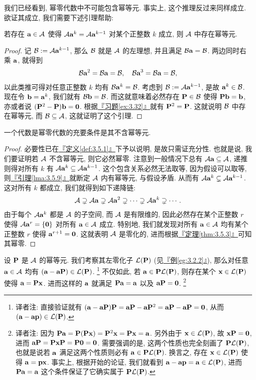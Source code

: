 \documentclass[lang=cn,zihao=-4,twoside,fontset=none]{textbook}
\def\eq#1{\[\begin{aligned}{}#1\end{aligned}\]}
\newcommand{\thmref}[1]{\hyperref[#1]{『定理\textnormal{\ref*{#1}}』}}
\newcommand{\defref}[1]{\hyperref[#1]{『定义\textnormal{\ref*{#1}}』}}
\newcommand{\lmaref}[1]{\hyperref[#1]{『引理\textnormal{\ref*{#1}}』}}
\newcommand{\egref}[1]{\hyperref[#1]{『例\textnormal{\ref*{#1}}』}}
\newcommand{\exref}[1]{\hyperref[#1]{『习题\textnormal{\ref*{#1}}』}}
\newcommand{\set}[1]{\{#1\}}
\newcommand{\bfnull}{\mathbf{0}}
\begin{document}
我们已经看到, 幂零代数中不可能包含幂等元. 事实上, 这个推理反过来同样成立. 欲证其成立, 我们需要下述引理帮助:

\begin{lem}
    \label{lma:3.5.9}%
    若存在 ${\mathbf a}\in{\mathcal A}$ 使得 ${\mathcal A}{\mathbf a}^k={\mathcal A}{\mathbf a}^{k-1}$ 对某个正整数 $k$ 成立, 则 ${\mathcal A}$ 中存在幂等元. 
\end{lem}

\begin{proof}
    记 ${\mathcal B}:={\mathcal A}{\mathbf a}^{k-1}$, 那么 ${\mathcal B}$ 就是 ${\mathcal A}$ 的左理想, 并且满足 ${\mathcal B}{\mathbf a}={\mathcal B}$. 两边同时右乘 ${\mathbf a}$, 就得到 
    \eq{
        \mB\bfa^2=\mB\bfa=\mB, \quad \mB\bfa^3=\mB\bfa=\mB,
    }
    以此类推可得对任意正整数 $k$ 均有 ${\mathcal B}{\mathbf a}^k={\mathcal B}$. 考虑到 ${\mathcal B}:={\mathcal A}{\mathbf a}^{k-1}$, 是故 ${\mathbf a}^k\in{\mathcal B}$. 现在令 ${\mathbf b}={\mathbf a}^k$, 我们就有 ${\mathcal B}{\mathbf b}={\mathcal B}$. 而这就意味着必然存在 ${\mathbf P}\in{\mathcal B}$ 使得 ${\mathbf P}{\mathbf b}={\mathbf b}$, 亦或者说 $(\bfP^2-\bfP)\bfb=\bfnull$. 根据\exref{ex:3.32}就有 ${\mathbf P}^2={\mathbf P}$. 这就说明 ${\mathcal B}$ 中存在幂等元, 而 ${\mathcal B}\subseteq{\mathcal A}$, 这就证明了这个引理.
\end{proof}

\begin{prop}
    \label{prop:3.5.10}%
    一个代数是幂零代数的充要条件是其不含幂等元.
\end{prop}
\begin{proof}
    必要性已在\defref{def:3.5.1}下予以说明, 是故只需证充分性. 也就是说, 我们要证明若 ${\mathcal A}$ 不含幂等元, 则它必然幂零. 注意到一般情况下总有 ${\mathcal A}{\mathbf a}\subseteq{\mathcal A}$, 递推则得对所有 $k$ 有 ${\mathcal A}{\mathbf a}^k\subseteq{\mathcal A}{\mathbf a}^{k-1}$. 这个包含关系必然无法取等, 因为假设可以取等, 则\lmaref{lma:3.5.9}就断定 ${\mathcal A}$ 内有幂等元, 与假设矛盾. 从而有 ${\mathcal A}{\mathbf a}^k\subsetneq{\mathcal A}{\mathbf a}^{k-1}$. 这对所有 $k$ 都成立, 我们就得到如下递降链:
    \eq{
        \mA\supsetneq \mA\bfa \supsetneq \mA\bfa^2 \supsetneq \dots \supsetneq \mA\bfa^k \supsetneq \cdots .
    }
    由于每个 ${\mathcal A}{\mathbf a}^k$ 都是 ${\mathcal A}$ 的子空间, 而 ${\mathcal A}$ 是有限维的, 因此必然存在某个正整数 $r$ 使得 $\mA\bfa^r=\set{\bfnull}$ 对所有 ${\mathbf a}\in{\mathcal A}$ 成立. 特别地, 我们就发现对所有 ${\mathbf a}\in{\mathcal A}$ 均有某个正整数 $r$ 使得 $\bfa^{r+1}=\bfnull$. 这就表明 ${\mathcal A}$ 是零化的, 进而根据\thmref{thm:3.5.3}可知其幂零. 
\end{proof}

设 ${\mathbf P}$ 是 ${\mathcal A}$ 的幂等元. 我们考察其左零化子 ${\mathcal L}({\mathbf P})$ (见\egref{eg:3.2.2}), 那么对任意 ${\mathbf a}\in{\mathcal A}$ 均有 $({\mathbf a}-{\mathbf a}{\mathbf P})\in{\mathcal L}({\mathbf P})$. \footnote{译者注: 直接验证就有 $(\bfa-\bfa\bfP)\bfP=\bfa\bfP-\bfa\bfP^2=\bfa\bfP-\bfa\bfP=\bfnull$, 从而 $({\mathbf a}-{\mathbf a}{\mathbf p})\in{\mathcal L}({\mathbf P})$.} 不仅如此, 若 ${\mathbf a}\in{\mathbf P}{\mathcal L}({\mathbf P})$, 则存在某个 ${\mathbf x}\in{\mathcal L}({\mathbf P})$ 使得 ${\mathbf a}={\mathbf P}{\mathbf x}$. 进而这样的 ${\mathbf a}$ 就满足 ${\mathbf P}{\mathbf a}={\mathbf a}$ 以及 $\bfa\bfP=\bfnull$. \footnote{译者注: 因为 ${\mathbf P}{\mathbf a}={\mathbf P}({\mathbf P}{\mathbf x})={\mathbf P}^2{\mathbf x}={\mathbf P}{\mathbf x}={\mathbf a}$. 另外由于 ${\mathbf x}\in{\mathcal L}({\mathbf P})$, 故 $\bfx\bfP=\bfnull$, 进而 $\bfa\bfP=\bfP\bfx\bfP=\bfP\bfnull=\bfnull$. 需要强调的是, 这两个性质也完全刻画了 ${\mathbf P}{\mathcal L}({\mathbf P})$, 也就是说若 ${\mathbf a}$ 满足这两个性质则必有 ${\mathbf a}\in{\mathbf P}{\mathcal L}({\mathbf P})$. 换言之, 存在 ${\mathbf x}\in{\mathcal L}({\mathbf P})$ 使得 ${\mathbf a}={\mathbf p}{\mathbf x}$. 事实上, 根据开始的论证, 我们就看到 ${\mathbf a}-{\mathbf a}{\mathbf p}={\mathbf a}\in{\mathcal L}({\mathbf P})$, 进而 ${\mathbf P}{\mathbf a}={\mathbf a}$ 这个条件保证了它确实属于 ${\mathbf P}{\mathcal L}({\mathbf P})$.}
\end{document}
